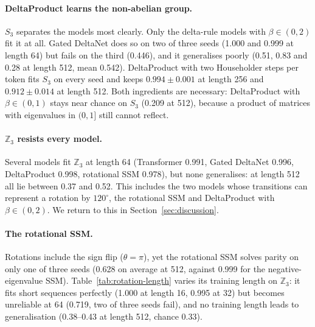 \paragraph{DeltaProduct learns the non-abelian group.} $S_3$ separates the models most clearly. Only the
delta-rule models with $\beta\in(0,2)$ fit it at all. Gated DeltaNet does so on two of three seeds (1.000 and
0.999 at length 64) but fails on the third (0.446), and it generalises poorly (0.51, 0.83 and 0.28 at length 512,
mean 0.542). DeltaProduct with two Householder steps per token fits $S_3$ on every seed and keeps
$0.994\pm0.001$ at length 256 and $0.912\pm0.014$ at length 512. Both ingredients are necessary: DeltaProduct with
$\beta\in(0,1)$ stays near chance on $S_3$ (0.209 at 512), because a product of matrices with eigenvalues in
$(0,1]$ still cannot reflect.

\paragraph{$\mathbb{Z}_3$ resists every model.} Several models fit $\mathbb{Z}_3$ at length 64 (Transformer
0.991, Gated DeltaNet 0.996, DeltaProduct 0.998, rotational SSM 0.978), but none generalises: at length 512
all lie between 0.37 and 0.52. This includes the two models whose transitions can represent a rotation by
$120^\circ$, the rotational SSM and DeltaProduct with $\beta\in(0,2)$. We return to this in
Section~\ref{sec:discussion}.

\paragraph{The rotational SSM.} Rotations include the sign flip ($\theta=\pi$), yet the rotational SSM solves
parity on only one of three seeds (0.628 on average at 512, against 0.999 for the negative-eigenvalue SSM).
Table~\ref{tab:rotation-length} varies its training length on $\mathbb{Z}_3$: it fits short sequences perfectly
(1.000 at length 16, 0.995 at 32) but becomes unreliable at 64 (0.719, two of three seeds fail), and no training
length leads to generalisation (0.38--0.43 at length 512, chance 0.33).

\begin{table}[htbp]\centering\small

\caption{Rotational SSM on $\mathbb{Z}_3$ trained at lengths 16, 32 and 64 (mean $\pm$ std over 3 seeds); the
first entry of each row is the training length.}
\label{tab:rotation-length}
\end{table}

